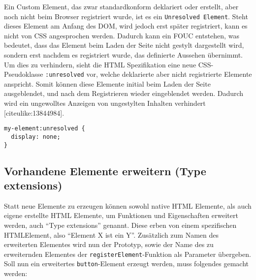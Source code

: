 Ein Custom Element, das zwar standardkonform deklariert oder erstellt,
aber noch nicht beim Browser registriert wurde, ist es ein
\texttt{Unresolved\ Element}. Steht dieses Element am Anfang des DOM,
wird jedoch erst später registriert, kann es nicht von CSS angesprochen
werden. Dadurch kann ein FOUC entstehen, was bedeutet, dass das Element
beim Laden der Seite nicht gestylt dargestellt wird, sondern erst
nachdem es registriert wurde, das definierte Aussehen übernimmt. Um dies
zu verhindern, sieht die HTML Spezifikation eine neue CSS-Pseudoklasse
\texttt{:unresolved} vor, welche deklarierte aber nicht registrierte
Elemente anspricht. Somit können diese Elemente initial beim Laden der
Seite ausgeblendet, und nach dem Registrieren wieder eingeblendet
werden. Dadurch wird ein ungewolltes Anzeigen von ungestylten Inhalten
verhindert {[}citeulike:13844984{]}.

\begin{verbatim}
my-element:unresolved {
  display: none;
}
\end{verbatim}

\subsection{Vorhandene Elemente erweitern (Type
extensions)}\label{vorhandene-elemente-erweitern-type-extensions}

Statt neue Elemente zu erzeugen können sowohl native HTML Elemente, als
auch eigene erstellte HTML Elemente, um Funktionen und Eigenschaften
erweitert werden, auch ``Type extensions'' genannt. Diese erben von
einem spezifischen HTMLElement, also ``Element X ist ein Y''. Zusätzlich
zum Namen des erweiterten Elementes wird nun der Prototyp, sowie der
Name des zu erweiternden Elementes der \texttt{registerElement}-Funktion
als Parameter übergeben. Soll nun ein erweitertes
\texttt{button}-Element erzeugt werden, muss folgendes gemacht werden:

\begin{Shaded}
\begin{Highlighting}[]
 \OperatorTok{=} \NormalTok{(}\OperatorTok{,} \OperatorTok{\{}
  \OperatorTok{:} \NormalTok{(}\NormalTok{)}\OperatorTok{,}
  \OperatorTok{:} 
\OperatorTok{\}}\NormalTok{)}\OperatorTok{;}
\end{Highlighting}
\end{Shaded}

